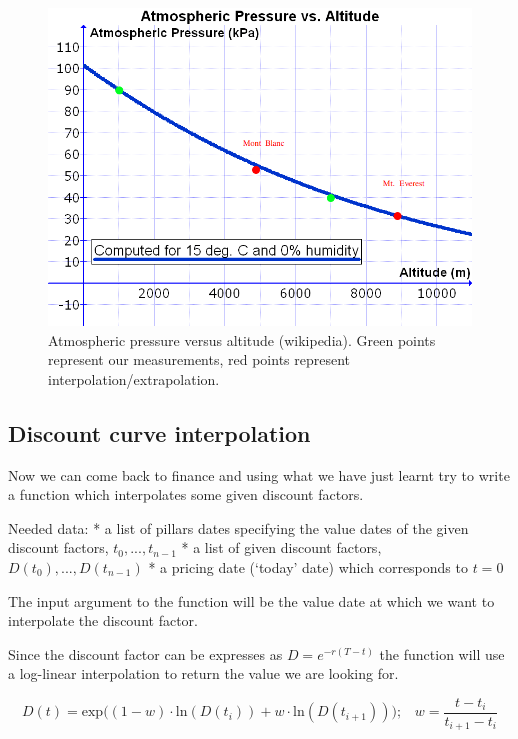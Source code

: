 \documentclass[11pt]{article}
\makeatletter
\def\maxwidth{\ifdim\Gin@nat@width>\linewidth\linewidth
    \else\Gin@nat@width\fi}
\let\Oldincludegraphics\includegraphics
\renewcommand{\includegraphics}[1]{\Oldincludegraphics[width=.8\maxwidth]{#1}}
\makeatother
\begin{document}
    \begin{figure}
\centering
\includegraphics{Atmospheric_Pressure_vs._Altitude.png}
\caption{Atmospheric pressure versus altitude (wikipedia). Green points
represent our measurements, red points represent
interpolation/extrapolation.}
\end{figure}

    \hypertarget{discount-curve-interpolation}{%
\subsection{Discount curve
interpolation}\label{discount-curve-interpolation}}

Now we can come back to finance and using what we have just learnt try
to write a function which interpolates some given discount factors.

Needed data: * a list of pillars dates specifying the value dates of the
given discount factors, \(t_0,...,t_{n-1}\) * a list of given discount
factors, \(D(t_0),...,D(t_{n-1})\) * a pricing date (`today' date) which
corresponds to \(t=0\)

The input argument to the function will be the value date at which we
want to interpolate the discount factor.

Since the discount factor can be expresses as \(D=e^{-r(T-t)}\) the
function will use a log-linear interpolation to return the value we are
looking for.

\[D(t) = \mathrm{exp}\Big( (1-w)\cdot \mathrm{ln}(D(t_i)) + w\cdot \mathrm{ln}(D(t_{i+1}))\Big);\;\;\;w=\frac{t-t_i}{t_{i+1}-t_i}\]
\end{document}
